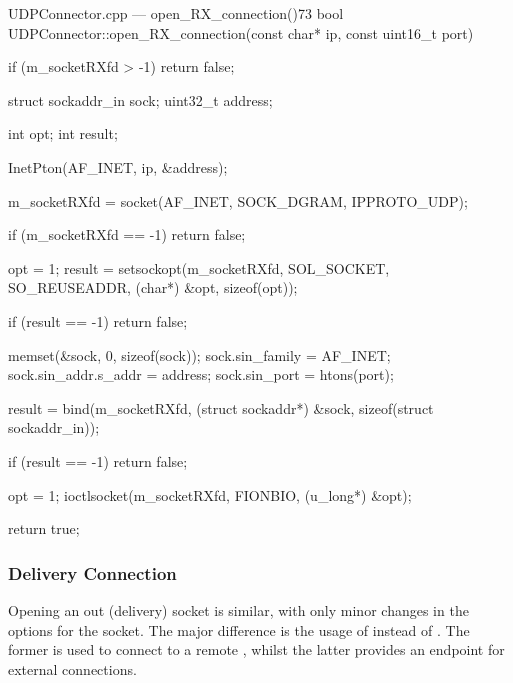 \begin{codelist}{UDPConnector.cpp --- open\_RX\_connection()}{73}
bool UDPConnector::open_RX_connection(const char* ip, const uint16_t port) {
    if (m_socketRXfd > -1)
        return false;

    struct sockaddr_in sock;
    uint32_t address;

    int opt;
    int result;

	InetPton(AF_INET, ip, &address);

    m_socketRXfd = socket(AF_INET, SOCK_DGRAM, IPPROTO_UDP);

    if (m_socketRXfd == -1)
        return false;

    opt = 1;
    result = setsockopt(m_socketRXfd, SOL_SOCKET, SO_REUSEADDR, (char*) &opt, sizeof(opt));

    if (result == -1)
        return false;

    memset(&sock, 0, sizeof(sock));
    sock.sin_family      = AF_INET;
    sock.sin_addr.s_addr = address;
    sock.sin_port        = htons(port);

    result = bind(m_socketRXfd, (struct sockaddr*) &sock, sizeof(struct sockaddr_in));

    if (result == -1)
        return false;

    opt = 1;
	ioctlsocket(m_socketRXfd, FIONBIO, (u_long*) &opt);

    return true;
}
\end{codelist}

\subsubsection{Delivery Connection}

Opening an out (delivery) socket is similar, with only minor changes in the options for the socket. The major difference is the usage of  instead of . The former is used to connect to a remote , whilst the latter provides an endpoint for external connections.

